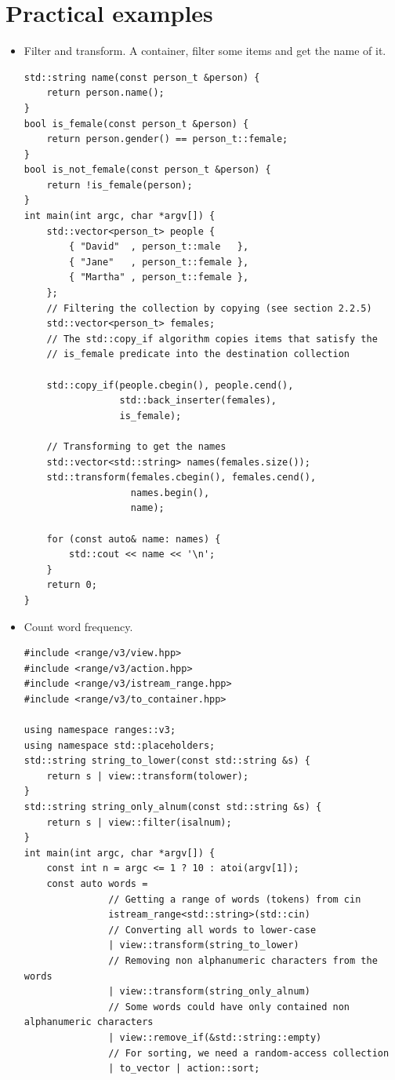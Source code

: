 \documentclass[a4paper,11pt,twoside]{book}
\begin{document}
\section{Practical examples}
\begin{itemize}
	
	\item Filter and transform. A container, filter some items and get the name of it.
\begin{lstlisting}
std::string name(const person_t &person) {
    return person.name();
}
bool is_female(const person_t &person) {
    return person.gender() == person_t::female;
}
bool is_not_female(const person_t &person) {
    return !is_female(person);
}
int main(int argc, char *argv[]) {
    std::vector<person_t> people {
        { "David"  , person_t::male   },
        { "Jane"   , person_t::female },
        { "Martha" , person_t::female },
    };
    // Filtering the collection by copying (see section 2.2.5)
    std::vector<person_t> females;
    // The std::copy_if algorithm copies items that satisfy the
    // is_female predicate into the destination collection

    std::copy_if(people.cbegin(), people.cend(),
                 std::back_inserter(females),
                 is_female);

    // Transforming to get the names
    std::vector<std::string> names(females.size());
    std::transform(females.cbegin(), females.cend(),
                   names.begin(),
                   name);

    for (const auto& name: names) {
        std::cout << name << '\n';
    }
    return 0;
}
\end{lstlisting}

\item Count word frequency. 
\begin{lstlisting}
#include <range/v3/view.hpp>
#include <range/v3/action.hpp>
#include <range/v3/istream_range.hpp>
#include <range/v3/to_container.hpp>

using namespace ranges::v3;
using namespace std::placeholders;
std::string string_to_lower(const std::string &s) {
    return s | view::transform(tolower);
}
std::string string_only_alnum(const std::string &s) {
    return s | view::filter(isalnum);
}
int main(int argc, char *argv[]) {
    const int n = argc <= 1 ? 10 : atoi(argv[1]);
    const auto words =
               // Getting a range of words (tokens) from cin
               istream_range<std::string>(std::cin)
               // Converting all words to lower-case
               | view::transform(string_to_lower)
               // Removing non alphanumeric characters from the words
               | view::transform(string_only_alnum)
               // Some words could have only contained non alphanumeric characters
               | view::remove_if(&std::string::empty)
               // For sorting, we need a random-access collection
               | to_vector | action::sort;


\end{lstlisting}
\end{itemize}
\end{document}
